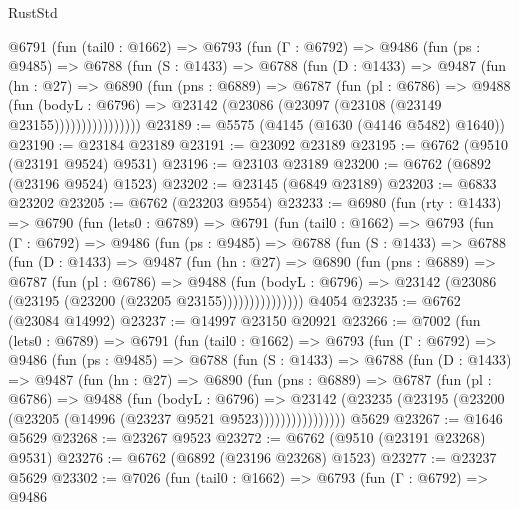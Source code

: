 \begin{lexlean}{RustStd}
\begin{coremodule}
        @6791
          (fun (tail0 : @1662) =>
          @6793
            (fun (Γ : @6792) =>
            @9486
              (fun (ps : @9485) =>
              @6788
                (fun (S : @1433) =>
                @6788
                  (fun (D : @1433) =>
                  @9487
                    (fun (hn : @27) =>
                    @6890
                      (fun (pns : @6889) =>
                      @6787
                        (fun (pl : @6786) =>
                        @9488
                          (fun (bodyL : @6796) =>
                          @23142 (@23086 (@23097 (@23108 (@23149 @23155))))))))))))))))
@23189 := @5575 (@4145 (@1630 (@4146 @5482) @1640))
@23190 := @23184 @23189
@23191 := @23092 @23189
@23195 := @6762 (@9510 (@23191 @9524) @9531)
@23196 := @23103 @23189
@23200 := @6762 (@6892 (@23196 @9524) @1523)
@23202 := @23145 (@6849 @23189)
@23203 := @6833 @23202
@23205 := @6762 (@23203 @9554)
@23233 := @6980
    (fun (rty : @1433) =>
    @6790
      (fun (lets0 : @6789) =>
      @6791
        (fun (tail0 : @1662) =>
        @6793
          (fun (Γ : @6792) =>
          @9486
            (fun (ps : @9485) =>
            @6788
              (fun (S : @1433) =>
              @6788
                (fun (D : @1433) =>
                @9487
                  (fun (hn : @27) =>
                  @6890
                    (fun (pns : @6889) =>
                    @6787
                      (fun (pl : @6786) =>
                      @9488
                        (fun (bodyL : @6796) =>
                        @23142 (@23086 (@23195 (@23200 (@23205 @23155)))))))))))))))
    @4054
@23235 := @6762 (@23084 @14992)
@23237 := @14997 @23150 @20921
@23266 := @7002
    (fun (lets0 : @6789) =>
    @6791
      (fun (tail0 : @1662) =>
      @6793
        (fun (Γ : @6792) =>
        @9486
          (fun (ps : @9485) =>
          @6788
            (fun (S : @1433) =>
            @6788
              (fun (D : @1433) =>
              @9487
                (fun (hn : @27) =>
                @6890
                  (fun (pns : @6889) =>
                  @6787
                    (fun (pl : @6786) =>
                    @9488
                      (fun (bodyL : @6796) =>
                      @23142
                        (@23235 (@23195 (@23200 (@23205 (@14996 (@23237 @9521 @9523))))))))))))))))
    @5629
@23267 := @1646 @5629
@23268 := @23267 @9523
@23272 := @6762 (@9510 (@23191 @23268) @9531)
@23276 := @6762 (@6892 (@23196 @23268) @1523)
@23277 := @23237 @5629
@23302 := @7026
    (fun (tail0 : @1662) =>
    @6793
      (fun (Γ : @6792) =>
      @9486

\end{coremodule}
\end{lexlean}
